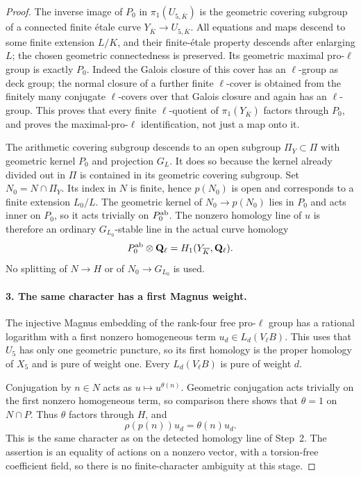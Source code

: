 \begin{proof}
The inverse image of $P_0$ in $\pi_1(U_{5,\overline K})$ is the
geometric covering subgroup of a connected finite \'etale curve
$Y_{\overline K}\to U_{5,\overline K}$. All equations and maps
descend to some finite extension $L/K$, and their finite-\'etale
property descends after enlarging $L$; the chosen geometric
connectedness is preserved. Its geometric maximal pro-$\ell$
group is exactly $P_0$. Indeed the Galois closure of this cover
has an $\ell$-group as deck group; the normal closure of a further
finite $\ell$-cover is obtained from the finitely many conjugate
$\ell$-covers over that Galois closure and again has an
$\ell$-group. This proves that every finite $\ell$-quotient of
$\pi_1(Y_{\overline K})$ factors through $P_0$, and proves the
maximal-pro-$\ell$ identification, not just a map onto it.

The arithmetic covering subgroup descends to an open subgroup
$\Pi_Y\subset\Pi$ with geometric kernel $P_0$ and projection
$G_L$. It does so because the kernel already divided out in
$\Pi$ is contained in its geometric covering subgroup. Set
$N_0=N\cap\Pi_Y$. Its index in $N$ is finite, hence
$p(N_0)$ is open and corresponds to a finite extension $L_0/L$.
The geometric kernel of $N_0\to p(N_0)$ lies in $P_0$ and acts
inner on $P_0$, so it acts trivially on $P_0^{\rm ab}$.
The nonzero homology line of $u$ is therefore an ordinary
$G_{L_0}$-stable line in the actual curve homology
\[
 P_0^{\rm ab}\otimes\mathbf Q_\ell
 =H_1(Y_{\overline K},\mathbf Q_\ell).
\]
No splitting of $N\to H$ or of $N_0\to G_{L_0}$ is used.

\paragraph{3. The same character has a first Magnus weight.}
The injective Magnus embedding of the rank-four free pro-$\ell$
group has a rational logarithm with a first nonzero homogeneous
term $u_d\in L_d(V_\ell B)$. This uses that $U_5$ has only one
geometric puncture, so its first homology is the proper homology
of $X_5$ and is pure of weight one. Every $L_d(V_\ell B)$ is
pure of weight $d$.

Conjugation by $n\in N$ acts as $u\mapsto u^{\theta(n)}$.
Geometric conjugation acts trivially on the first nonzero
homogeneous term, so comparison there shows that $\theta=1$
on $N\cap P$. Thus $\theta$ factors through $H$, and
\[
 \rho(p(n))u_d=\theta(n)u_d.
\]
This is the same character as on the detected homology line
of Step~2. The assertion is an equality of actions on a
nonzero vector, with a torsion-free coefficient field, so
there is no finite-character ambiguity at this stage.


\end{proof}
